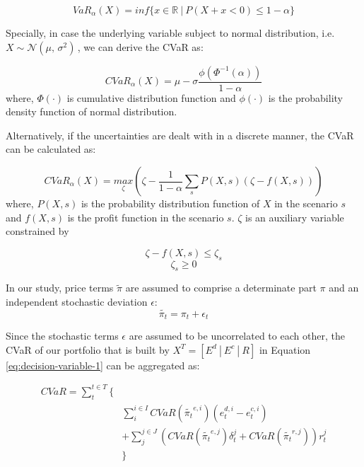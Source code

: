 \begin{equation}
\label{VaR}
VaR_\alpha(X) = inf \{x \in \mathbb{R}~|~ P(X+x<0)\leq 1-\alpha\}
\end{equation}

Specially, in case the underlying variable subject to normal distribution, i.e. $X \sim \mathcal{N}(\mu,\,\sigma^{2})\,$, we can derive the CVaR as:

\begin{equation}
CVaR_\alpha(X) = \mu - \sigma \frac{\phi(\Phi^{-1}(\alpha))}{1-\alpha}
\end{equation}
where, $\Phi(\cdot)$ is cumulative distribution function and $\phi(\cdot)$ is the probability density function of normal distribution.

Alternatively, if the uncertainties are dealt with in a discrete manner, the CVaR can be calculated as\cite{Rockafellar2000}:

\begin{equation}
CVaR_\alpha (X) = \underset{\zeta}{max}\left( \zeta - \frac{1}{1-\alpha} \sum_{s} P(X,s) (\zeta - f(X,s))\right)
\end{equation}
where, $P(X,s)$ is the probability distribution function of $X$ in the scenario $s$ and $f(X,s)$ is the profit function in the scenario $s$. $\zeta$ is an auxiliary variable constrained by

\begin{equation*}
\zeta - f(X,s) \leq \zeta_s
\end{equation*}
\begin{equation*}
\zeta_s \geq 0
\end{equation*}

In our study, price terms $\tilde{\pi}$ are assumed to comprise a determinate part $\pi$ and an independent stochastic deviation $\epsilon$:
\begin{equation}
\label{eq:price-error}
\tilde{\pi_t}= \pi_t + \epsilon_t
\end{equation}

Since the stochastic terms $\epsilon$ are assumed to be uncorrelated to each other, the CVaR of our portfolio that is built by  $X^T = [E^d~|~E^c~|~R]$
in Equation \eqref{eq:decision-variable-1} can be aggregated as:

\begin{equation}
\begin{aligned}
CVaR =\sum_{t}^{t \in T} \{&\\
&\sum_{i}^{i \in I}  CVaR(\tilde{\pi_t}^{e,i}) (e_t^{d,i} - e_t^{c,i})  \\
&+ \sum_{j}^{j \in J} \left(CVaR(\tilde{\pi_t}^{e,j}) \delta_t^{j} + CVaR(\tilde{\pi_t}^{r,j})\right) r_t^j \\
&\}
\end{aligned}
\end{equation}

